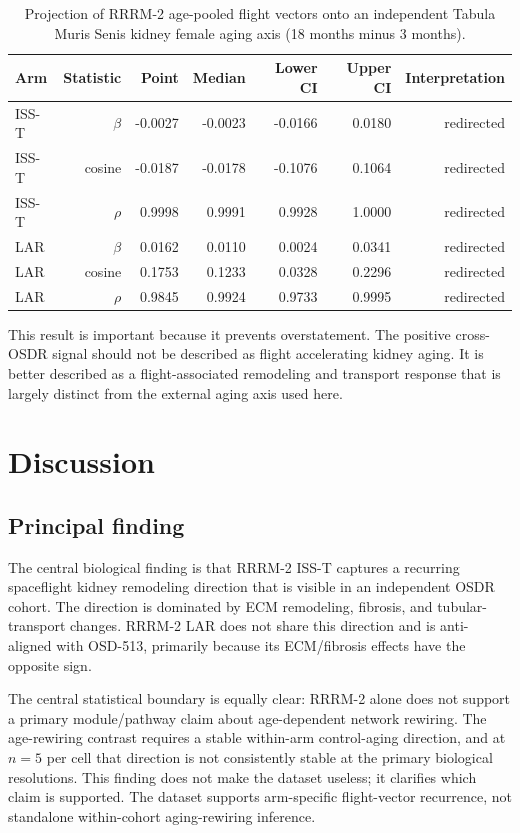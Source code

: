 \documentclass[11pt]{article}
\begin{document}
\begin{table}[h]
\centering\small
\begin{tabular}{lrrrrrr}
\toprule
Arm & Statistic & Point & Median & Lower CI & Upper CI & Interpretation \\
\midrule
ISS-T & $\beta$ & -0.0027 & -0.0023 & -0.0166 & 0.0180 & redirected \\
ISS-T & cosine & -0.0187 & -0.0178 & -0.1076 & 0.1064 & redirected \\
ISS-T & $\rho$ & 0.9998 & 0.9991 & 0.9928 & 1.0000 & redirected \\
LAR & $\beta$ & 0.0162 & 0.0110 & 0.0024 & 0.0341 & redirected \\
LAR & cosine & 0.1753 & 0.1233 & 0.0328 & 0.2296 & redirected \\
LAR & $\rho$ & 0.9845 & 0.9924 & 0.9733 & 0.9995 & redirected \\
\bottomrule
\end{tabular}
\caption{Projection of RRRM-2 age-pooled flight vectors onto an independent Tabula Muris Senis kidney female aging axis (18 months minus 3 months).}
\label{tab:tms}
\end{table}

This result is important because it prevents overstatement. The positive cross-OSDR signal should not be described as flight accelerating kidney aging. It is better described as a flight-associated remodeling and transport response that is largely distinct from the external aging axis used here.

\section{Discussion}

\subsection{Principal finding}

The central biological finding is that RRRM-2 ISS-T captures a recurring spaceflight kidney remodeling direction that is visible in an independent OSDR cohort. The direction is dominated by ECM remodeling, fibrosis, and tubular-transport changes. RRRM-2 LAR does not share this direction and is anti-aligned with OSD-513, primarily because its ECM/fibrosis effects have the opposite sign.

The central statistical boundary is equally clear: RRRM-2 alone does not support a primary module/pathway claim about age-dependent network rewiring. The age-rewiring contrast requires a stable within-arm control-aging direction, and at $n=5$ per cell that direction is not consistently stable at the primary biological resolutions. This finding does not make the dataset useless; it clarifies which claim is supported. The dataset supports arm-specific flight-vector recurrence, not standalone within-cohort aging-rewiring inference.
\end{document}
